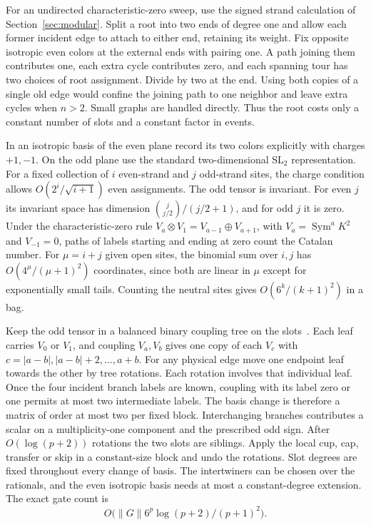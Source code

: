 \documentclass[11pt]{article}
\theoremstyle{definition}
\begin{document}
For an undirected characteristic-zero sweep, use the signed strand calculation of Section~\ref{sec:modular}. Split a root into two ends of degree one and allow each former incident edge to attach to either end, retaining its weight. Fix opposite isotropic even colors at the external ends with pairing one. A path joining them contributes one, each extra cycle contributes zero, and each spanning tour has two choices of root assignment. Divide by two at the end. Using both copies of a single old edge would confine the joining path to one neighbor and leave extra cycles when \(n>2\). Small graphs are handled directly. Thus the root costs only a constant number of slots and a constant factor in events.

In an isotropic basis of the even plane record its two colors explicitly with charges \(+1,-1\). On the odd plane use the standard two-dimensional \(\mathrm{SL}_2\) representation. For a fixed collection of \(i\) even-strand and \(j\) odd-strand sites, the charge condition allows \(O(2^i/\sqrt{i+1})\) even assignments. The odd tensor is invariant. For even \(j\) its invariant space has dimension \(\binom j{j/2}/(j/2+1)\), and for odd \(j\) it is zero. Under the characteristic-zero rule \(V_a\otimes V_1=V_{a-1}\oplus V_{a+1}\), with \(V_a=\operatorname{Sym}^a K^2\) and \(V_{-1}=0\), paths of labels starting and ending at zero count the Catalan number. For \(\mu=i+j\) given open sites, the binomial sum over \(i,j\) has \(O(4^\mu/(\mu+1)^2)\) coordinates, since both are linear in \(\mu\) except for exponentially small tails. Counting the neutral sites gives \(O(6^k/(k+1)^2)\) in a bag.

Keep the odd tensor in a balanced binary coupling tree on the slots~\cite{singh-vidal}. Each leaf carries \(V_0\) or \(V_1\), and coupling \(V_a,V_b\) gives one copy of each \(V_c\) with \(c=|a-b|,|a-b|+2,\ldots,a+b\). For any physical edge move one endpoint leaf towards the other by tree rotations. Each rotation involves that individual leaf. Once the four incident branch labels are known, coupling with its label zero or one permits at most two intermediate labels. The basis change is therefore a matrix of order at most two per fixed block. Interchanging branches contributes a scalar on a multiplicity-one component and the prescribed odd sign. After \(O(\log(p+2))\) rotations the two slots are siblings. Apply the local cup, cap, transfer or skip in a constant-size block and undo the rotations. Slot degrees are fixed throughout every change of basis. The intertwiners can be chosen over the rationals, and the even isotropic basis needs at most a constant-degree extension. The exact gate count is
\[
                  O\bigl(\|G\|6^p\log(p+2)/(p+1)^2\bigr).
\]
\end{document}
